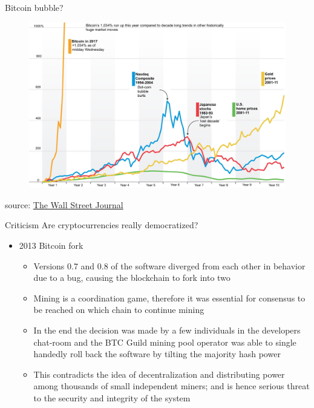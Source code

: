 \documentclass[11pt]{beamer}
\begin{document}

\begin{frame}{Bitcoin bubble?}
	\begin{figure}[]
		\centering
		\includegraphics  [width=4.in]{Images/bubble1}
	\end{figure}
	\begin{scriptsize}
		source: \href{https://www.wsj.com/articles/bitcoin-hits-10-000-as-sharp-rise-drowns-out-skeptics-1511919295}{The Wall Street Journal}
	\end{scriptsize}
\end{frame}


\begin{frame}{Criticism}
	Are cryptocurrencies really democratized? \vspace{5mm}
	\begin{itemize}
		\item 2013 Bitcoin fork
		\begin{itemize}
			\item Versions 0.7 and 0.8 of the software diverged from each other in behavior due to a bug, causing the blockchain to fork into two
			\item Mining is a coordination game, therefore it was essential for consensus to be reached on which chain to continue mining
			\item In the end the decision was made by a few individuals in the developers chat-room and the BTC Guild mining pool operator was able to single handedly roll back the software by tilting the majority hash power
			\item This contradicts the idea of decentralization and distributing power among thousands of small independent miners; and is hence serious threat to the security and integrity of the system
		\end{itemize}
	\end{itemize}
\end{frame}
\end{document}
